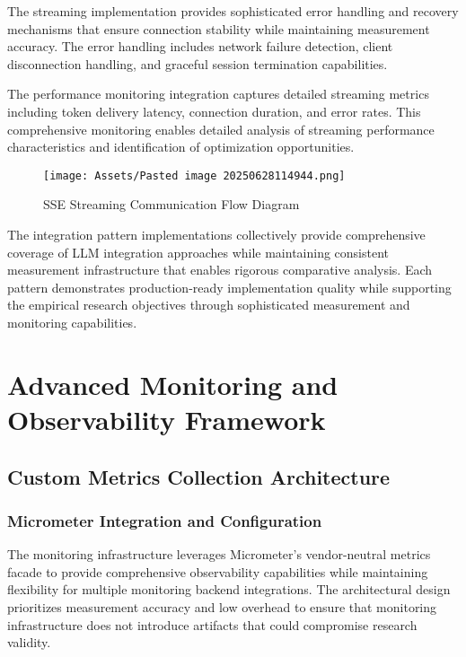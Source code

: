 The streaming implementation provides sophisticated error handling and recovery mechanisms that ensure connection stability while maintaining measurement accuracy. The error handling includes network failure detection, client disconnection handling, and graceful session termination capabilities.

The performance monitoring integration captures detailed streaming metrics including token delivery latency, connection duration, and error rates. This comprehensive monitoring enables detailed analysis of streaming performance characteristics and identification of optimization opportunities.

\begin{figure}[H]
    \centering
    \texttt{[image: Assets/Pasted image 20250628114944.png]}
    \caption{SSE Streaming Communication Flow Diagram}
\end{figure}


The integration pattern implementations collectively provide comprehensive coverage of LLM integration approaches while maintaining consistent measurement infrastructure that enables rigorous comparative analysis. Each pattern demonstrates production-ready implementation quality while supporting the empirical research objectives through sophisticated measurement and monitoring capabilities.

\chapter{Advanced Monitoring and Observability Framework}

\section{Custom Metrics Collection Architecture}

\subsection{Micrometer Integration and Configuration}

The monitoring infrastructure leverages Micrometer's vendor-neutral metrics facade to provide comprehensive observability capabilities while maintaining flexibility for multiple monitoring backend integrations. The architectural design prioritizes measurement accuracy and low overhead to ensure that monitoring infrastructure does not introduce artifacts that could compromise research validity.


